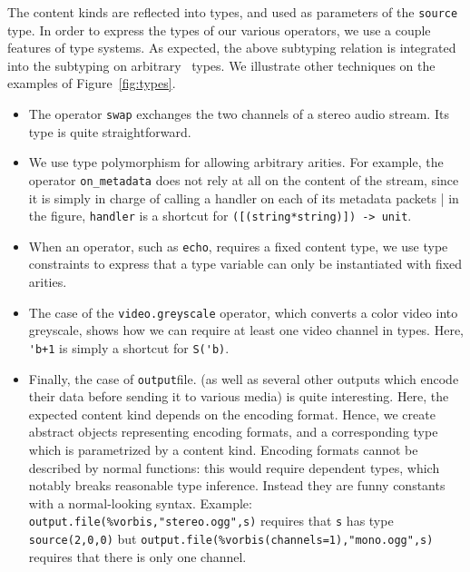 The content kinds are reflected into types,
and used as parameters of the \texttt{source} type.
In order to express the types of our various operators,
we use a couple features of type systems.
As expected, the above subtyping relation is integrated into
the subtyping on arbitrary \liquidsoap\ types.
We illustrate other techniques on the examples of Figure~\ref{fig:types}.
\begin{itemize}
\item
  The operator \texttt{swap} exchanges
  the two channels of a stereo audio stream.
  Its type is quite straightforward.
\item
  We use type polymorphism for allowing arbitrary arities.
  For example, the operator \verb.on_metadata. does not rely
  at all on the content of the stream, since it is simply in
  charge of calling a handler on each of its metadata packets |
  in the figure, \verb.handler. is a shortcut for
  \verb.([(string*string)]) -> unit..
\item
  When an operator, such as \verb.echo.,
  requires a fixed content type, we use type constraints
  to express that a type variable can only be instantiated with
  fixed arities.
\item
  The case of the \texttt{video.greyscale} operator,
  which converts a color video into greyscale, shows how we can
  require at least one video channel in types.
  Here, \verb.'b+1. is simply a shortcut for \verb.S('b)..
\item
  Finally, the case of \verb.output.file. (as well as several other outputs
  which encode their data before sending it to various media) is quite
  interesting.
  Here, the expected content kind depends on the encoding format.
  Hence, we create abstract objects representing encoding formats,
  and a corresponding type which is parametrized by a content kind.
  Encoding formats cannot be described by normal functions:
  this would require dependent types, which notably breaks reasonable
  type inference.
  Instead they are funny constants with a normal-looking syntax.
  Example: \verb$output.file(%vorbis,"stereo.ogg",s)$ requires that
  \verb.s. has type \verb.source(2,0,0). but
  \verb$output.file(%vorbis(channels=1),"mono.ogg",s)$ requires
  that there is only one channel.
\end{itemize}

